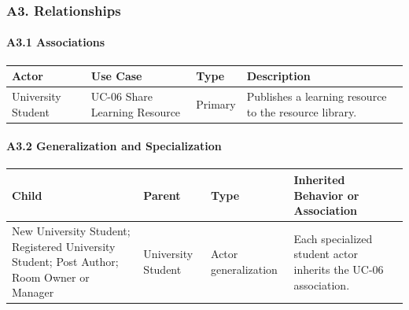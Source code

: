 \documentclass[12pt]{article}
\renewcommand{\baselinestretch}{1.5}
\begin{document}
\hypertarget{sec:a3-relationships}{}
\subsubsection*{A3. Relationships}
\par\medskip

\hypertarget{sec:a3-1-associations}{}
\paragraph*{A3.1 Associations}
\par\medskip

\begingroup
\small
\renewcommand{\baselinestretch}{1.0}\selectfont
\renewcommand{\arraystretch}{1.15}
\setlength{\tabcolsep}{6pt}
\begin{longtable}{|>{\raggedright\arraybackslash}p{}|>{\raggedright\arraybackslash}p{}|>{\raggedright\arraybackslash}p{}|>{\raggedright\arraybackslash}p{}|}
\hline
\textbf{Actor} & \textbf{Use Case} & \textbf{Type} & \textbf{Description} \\ \hline
\endhead
University Student & UC-06 Share Learning Resource & Primary & Publishes a learning resource to the resource library. \\ \hline
\end{longtable}
\endgroup
\par\medskip

\hypertarget{sec:a3-2-generalization-and-specialization}{}
\paragraph*{A3.2 Generalization and Specialization}
\par\medskip

\begingroup
\small
\renewcommand{\baselinestretch}{1.0}\selectfont
\renewcommand{\arraystretch}{1.15}
\setlength{\tabcolsep}{6pt}
\begin{longtable}{|>{\raggedright\arraybackslash}p{}|>{\raggedright\arraybackslash}p{}|>{\raggedright\arraybackslash}p{}|>{\raggedright\arraybackslash}p{}|}
\hline
\textbf{Child} & \textbf{Parent} & \textbf{Type} & \textbf{Inherited Behavior or Association} \\ \hline
\endhead
New University Student; Registered University Student; Post Author; Room Owner or Manager & University Student & Actor generalization & Each specialized student actor inherits the UC-06 association. \\ \hline
\end{longtable}
\endgroup
\par\medskip
\end{document}
